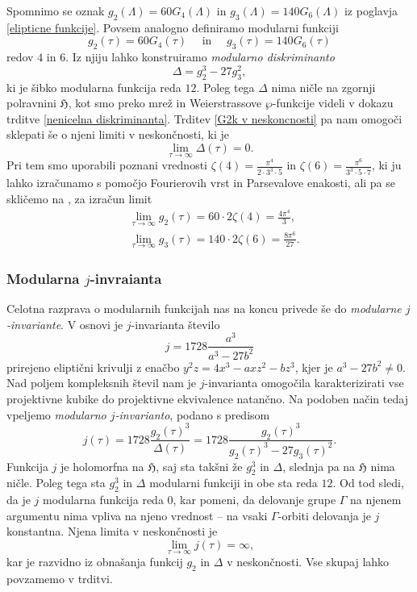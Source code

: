\documentclass[mat1]{fmfdelo}
\numberwithin{equation}{section}
\newcommand{\HH}{\mathfrak{H}}
\newcommand{\SL}{\Gamma}
\theoremstyle{definition}
\begin{document}
Spomnimo se oznak $g_2(\Lambda) = 60G_4(\Lambda)$ in $g_3(\Lambda) = 140G_6(\Lambda)$ iz poglavja \ref{elipticne funkcije}. Povsem analogno definiramo modularni funkciji
\[
    g_2(\tau) = 60G_4(\tau) \quad \text{ in } \quad g_3(\tau) = 140G_6(\tau)
\]
redov $4$ in $6$. Iz njiju lahko konstruiramo \emph{modularno diskriminanto}
\[
    \Delta = g_2^3 - 27g_3^2,
\]
ki je šibko modularna funkcija reda $12$. Poleg tega $\Delta$ nima ničle na zgornji polravnini $\HH$, kot smo preko mrež in Weierstrassove $\wp$-funkcije videli v dokazu trditve \ref{nenicelna diskriminanta}. Trditev \ref{G2k v neskoncnosti} pa nam omogoči sklepati še o njeni limiti v neskončnosti, ki je 
\[
    \lim_{\tau \to \infty} \Delta(\tau) = 0.
\]
Pri tem smo uporabili poznani vrednosti $\zeta(4) = \frac{\pi^4}{2\cdot3^3\cdot5}$ in $\zeta(6) = \frac{\pi^6}{3^3\cdot5\cdot7}$, ki ju lahko izračunamo s pomočjo Fourierovih vrst in Parsevalove enakosti, ali pa se skličemo na \cite[VII, \S4.1]{Serre}, za izračun limit
\begin{align*}
    &\lim_{\tau \to \infty} g_2(\tau) = 60\cdot2 \zeta(4) = \frac{4\pi^4}{3},\\
    &\lim_{\tau \to \infty} g_3(\tau) = 140\cdot2 \zeta(6) = \frac{8\pi^6}{27}.
\end{align*}

\subsubsection*{Modularna $j$-invraianta} Celotna razprava o modularnih funkcijah nas na koncu privede še do \emph{modularne $j$-invariante}. V osnovi je $j$-invarianta število 
\[
    j = 1728\frac{a^3}{a^3 - 27b^2}
\]
prirejeno eliptični krivulji z enačbo $y^2z = 4x^3 - axz^2 - bz^3$, kjer je $a^3 - 27b^2 \neq 0$. Nad poljem kompleksnih števil nam je $j$-invarianta omogočila karakterizirati vse projektivne kubike do projektivne ekvivalence natančno. Na podoben način tedaj vpeljemo \emph{modularno $j$-invarianto}, podano s predisom
\[
    j(\tau) = 1728\frac{g_2(\tau)^3}{\Delta(\tau)}
    = 1728\frac{g_2(\tau)^3}{g_2(\tau)^3 - 27g_3(\tau)^2}.
\]
Funkcija $j$ je holomorfna na $\HH$, saj sta takšni že $g_2^3$ in $\Delta$, slednja pa na $\HH$ nima ničle. Poleg tega sta $g_2^3$ in $\Delta$ modularni funkciji in obe sta reda $12$. Od tod sledi, da je $j$ modularna funkcija reda $0$, kar pomeni, da delovanje grupe $\SL$ na njenem argumentu nima vpliva na njeno vrednost -- na vsaki $\SL$-orbiti delovanja je $j$ konstantna. Njena limita v neskončnosti je 
\[
    \lim_{\tau \to \infty}j(\tau) = \infty,
\]
kar je razvidno iz obnašanja funkcij $g_2$ in $\Delta$ v neskončnosti. Vse skupaj lahko povzamemo v trditvi.
\end{document}
